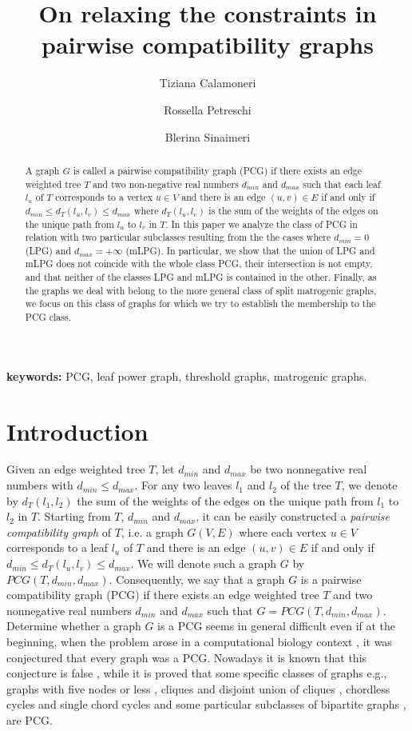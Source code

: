 \documentclass[dvipdfm]{llncs}
\title{On relaxing the constraints in pairwise compatibility graphs}
\author{Tiziana Calamoneri \and Rossella Petreschi \and Blerina Sinaimeri}
\newcommand{\dmin}{d_{min}}
\newcommand{\dmax}{d_{max}}
\begin{document}
\maketitle              


\begin{abstract}
A graph $G$ is called a pairwise compatibility graph (PCG) if there exists an edge weighted tree $T$ and two non-negative real numbers $d_{min}$ and $d_{max}$ such that each leaf $l_u$ of $T$ corresponds to a vertex $u \in V$ and there is an edge $(u,v) \in E$ if and only if $d_{min} \leq d_T (l_u, l_v) \leq d_{max}$ where $d_T (l_u, l_v)$ is the sum of the weights of the edges on the unique path from $l_u$ to $l_v$ in $T$.  In this paper we analyze the class of PCG in relation with two particular subclasses resulting from the the cases where $\dmin=0$ (LPG) and $\dmax=+\infty$ (mLPG). In particular, we show that the union of LPG and mLPG does not coincide with the whole class PCG, their intersection is not empty, and that neither of the classes LPG and mLPG is contained in the other.  Finally, as the graphs we deal with belong to the more general class of split matrogenic graphs,  we focus on this class of graphs for which we try to establish the membership to the PCG class. 



\end{abstract}

{\bf keywords:} PCG, leaf power graph, threshold graphs, matrogenic graphs.


\section{Introduction}

Given an edge weighted tree $T$, let $d_{min}$ and $d_{max}$ be two nonnegative real numbers with $d_{min} \leq d_{max}$. For any two leaves $l_1$ and $l_2$ of the tree $T$, we denote by $d_T (l_1, l_2)$ the sum of the weights of the edges on the unique path from $l_1$ to $l_2$ in $T$. Starting from $T$, $\dmin$ and $\dmax$, it can be easily constructed a \textsl{pairwise compatibility graph }of $T$, i.e. a graph $G(V,E)$ where each vertex $u \in V$ corresponds to a leaf $l_u$ of $T$ and there is an edge $(u,v) \in E$ if and only if $d_{min} \leq d_T (l_u, l_v) \leq d_{max}$. We will denote such a graph $G$ by $PCG(T,d_{min}, d_{max})$. Consequently, we say that a graph $G$ is a pairwise compatibility graph (PCG) if there exists an edge weighted tree $T$ and two nonnegative real numbers  $d_{min}$ and $d_{max}$ such that $G=PCG(T,d_{min}, d_{max})$. Determine whether a graph $G$ is a PCG seems in general difficult even if at the beginning, when the problem arose in a computational biology context \cite{Kal03}, it was conjectured that every graph was a PCG. Nowadays it is known that this conjecture is false \cite{YBR10}, while it is proved that some specific classes of graphs e.g., graphs with five nodes or less \cite{P02}, cliques and disjoint union of cliques \cite{B}, chordless cycles and single chord cycles \cite{YHR09} and some particular subclasses of bipartite graphs \cite{YBR10}, are PCG.
\end{document}
